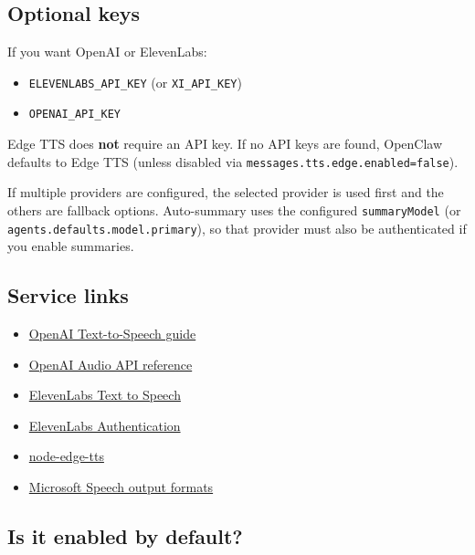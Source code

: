 \subsection{Optional keys}


If you want OpenAI or ElevenLabs:

\begin{itemize}
  \item \texttt{ELEVENLABS\_API\_KEY} (or \texttt{XI\_API\_KEY})
  \item \texttt{OPENAI\_API\_KEY}
\end{itemize}


Edge TTS does \textbf{not} require an API key. If no API keys are found, OpenClaw defaults
to Edge TTS (unless disabled via \texttt{messages.tts.edge.enabled=false}).

If multiple providers are configured, the selected provider is used first and the others are fallback options.
Auto-summary uses the configured \texttt{summaryModel} (or \texttt{agents.defaults.model.primary}),
so that provider must also be authenticated if you enable summaries.

\subsection{Service links}


\begin{itemize}
  \item \href{https://platform.openai.com/docs/guides/text-to-speech}{OpenAI Text-to-Speech guide}
  \item \href{https://platform.openai.com/docs/api-reference/audio}{OpenAI Audio API reference}
  \item \href{https://elevenlabs.io/docs/api-reference/text-to-speech}{ElevenLabs Text to Speech}
  \item \href{https://elevenlabs.io/docs/api-reference/authentication}{ElevenLabs Authentication}
  \item \href{https://github.com/SchneeHertz/node-edge-tts}{node-edge-tts}
  \item \href{https://learn.microsoft.com/azure/ai-services/speech-service/rest-text-to-speech\#audio-outputs}{Microsoft Speech output formats}
\end{itemize}


\subsection{Is it enabled by default?}


